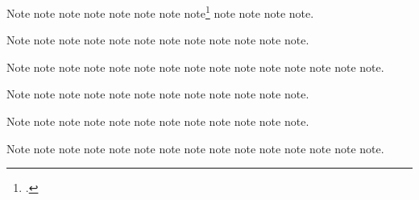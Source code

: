 \documentclass[a4paper,12pt]{report}
\begin{document}
Note\autocite{loften:hamlet} note\autocite{maisonneuve:relations}
note\autocite{lippincott:chicago} note\autocite{loften:hamlet}
note\autocite{mchugh:wake} note\autocite{mcmillen:antebellum}
note\autocite{maisonneuve:relations}
note\footnote{.}
note\autocite{mchugh:wake} note\autocite[6.9.4]{mla:style}
note\autocite{morgenson:market} note\autocite{mozart:figaro}.

Note\autocite{murphy:silent} note\autocite{nasa:db}
note\autocite{nass:address} note\autocite{mcmillen:antebellum}
note\autocite{natrecoff:camera} note\autocite[2:25]{meredith:letters}
note\autocite[6.9.5]{mla:style} note\autocite{morgenson:market}
note\autocite{murphy:silent} note\autocite{mozart:figaro}
note\autocite{nasa:db} note\autocite{nass:address}.

Note\autocite{nyt:obittrevor} note\autocite{nyt:trevorobit}
note\autocite{nytrumpet:art} note\autocite{osborne:poison}
note\autocite{oed:cdrom} note\autocite{natrecoff:camera}
note\autocite{palmatary:pottery} note\autocite{nyt:obittrevor}
note\autocite{nyt:trevorobit} note\autocite[arithmetical]{oed:cdrom}
note\autocite{nytrumpet:art} note\autocite{pelikan:christian}
note\autocite{petroff:impurity} note\autocite{osborne:poison}
note\autocite{phibbs:diary}.

Note\autocite{palmatary:pottery} note\autocite{pirumova}
note\autocite{pelikan:christian} note\autocite{petroff:impurity}
note\autocite{plato:republic:gr} note\autocite{polakow:afterw}
note\autocite{phibbs:diary}
note\autocite[360e--361b]{plato:republic:gr} note\autocite{pirumova}
note\autocite{polakow:afterw} note\autocite{pollan:plant}
note\autocite{powell:email}.

Note\autocite{prose:intro} note\autocite{ratliff:review}
note\autocite{reaves:rosen} note\autocite{pollan:plant}
note\autocite{powell:email} note\autocite{prose:intro}
note\autocite{rodman:walk} note\autocite{roosevelt:speech}
note\autocite{ross:thesis} note\autocite{ratliff:review}
note\autocite{rozner:liberation} note\autocite{rubinstein:chopin}.

Note\autocite{saberhagen:beluga} note\autocite{schellinger:novel}
note\autocite{reaves:rosen} note\autocite{schubert:muellerin}
note\autocite{rodman:walk} note\autocite{schweitzer:bach}
note\autocite{roosevelt:speech} note\autocite{ross:thesis}
note\autocite{rozner:liberation} note\autocite{rubinstein:chopin}
note\autocite{sechzer:women} note\autocite{schellinger:novel}
note\autocite{sereny:cries} note\autocite{schubert:muellerin}
note\autocite{saberhagen:beluga}.
\end{document}
